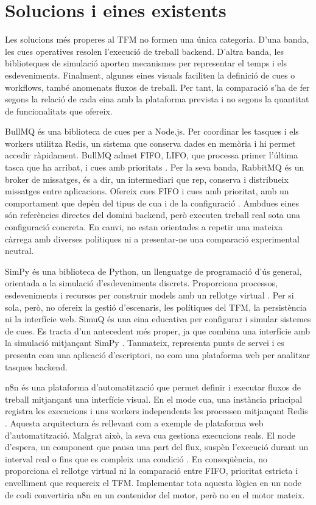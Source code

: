 \section{Solucions i eines existents}

Les solucions més properes al TFM no formen una única categoria. D'una banda,
les cues operatives resolen l'execució de treball backend. D'altra banda, les
biblioteques de simulació aporten mecanismes per representar el temps i els
esdeveniments. Finalment, algunes eines visuals faciliten la definició de cues o
workflows, també anomenats fluxos de treball. Per tant, la comparació s'ha de
fer segons la relació de cada eina amb la plataforma prevista i no segons la
quantitat de funcionalitats que ofereix.

BullMQ és una biblioteca de cues per a Node.js. Per coordinar les tasques i els
workers utilitza Redis, un sistema que conserva dades en memòria i hi permet
accedir ràpidament. BullMQ admet FIFO, LIFO, que processa primer l'última tasca
que ha arribat, i cues amb prioritats \parencite{bullmqPrioritized}. Per la seva
banda, RabbitMQ és un broker de missatges, és a dir, un intermediari que rep,
conserva i distribueix missatges entre aplicacions. Ofereix cues FIFO i cues amb
prioritat, amb un comportament que depèn del tipus de cua i de la configuració
\parencite{rabbitmqPriority}. Ambdues eines són referències directes del domini
backend, però executen treball real sota una configuració concreta. En canvi,
no estan orientades a repetir una mateixa càrrega amb diverses polítiques ni a
presentar-ne una comparació experimental neutral.

SimPy és una biblioteca de Python, un llenguatge de programació d'ús general,
orientada a la simulació d'esdeveniments discrets. Proporciona processos,
esdeveniments i recursos per construir models amb un rellotge virtual
\parencite{simpyTime}. Per si sola, però, no ofereix la gestió d'escenaris, les
polítiques del TFM, la persistència ni la interfície web.
SimuQ és una eina educativa per configurar i simular sistemes de cues. Es tracta
d'un antecedent més proper, ja que combina una interfície amb la simulació
mitjançant SimPy \parencite{caballero2016simuq}. Tanmateix, representa punts de
servei i es presenta com una aplicació d'escriptori, no com una plataforma web
per analitzar tasques backend.

n8n és una plataforma d'automatització que permet definir i executar fluxos de
treball mitjançant una interfície visual. En el mode cua, una instància
principal registra les execucions i uns workers independents les processen
mitjançant Redis \parencite{n8nQueueMode}. Aquesta arquitectura és rellevant com
a exemple de plataforma web d'automatització. Malgrat això, la seva cua gestiona
execucions reals. El node d'espera, un component que pausa una part del flux,
suspèn l'execució durant un interval real o fins que es compleix una condició
\parencite{n8nWait}. En conseqüència, no proporciona el rellotge virtual ni la
comparació entre FIFO, prioritat estricta i envelliment que requereix el TFM.
Implementar tota aquesta lògica en un node de codi convertiria n8n en un
contenidor del motor, però no en el motor mateix.

